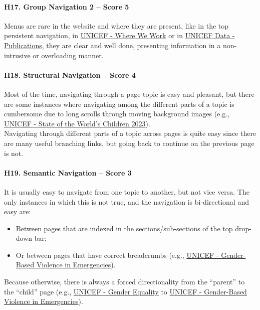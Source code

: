 \paragraph*{H17. Group Navigation 2 – Score 5}
Menus are rare in the website and where they are present, like in the top persistent navigation, in \href{https://www.unicef.org/where-we-work}{UNICEF - Where We Work} or in \href{https://data.unicef.org/resources/resource-type/publications/}{UNICEF Data - Publications}, they are clear and well done, presenting information in a non-intrusive or overloading manner.

\paragraph*{H18. Structural Navigation – Score 4}
Most of the time, navigating through a page topic is easy and pleasant, but there are some instances where navigating among the different parts of a topic is cumbersome due to long scrolls through moving background images (e.g., \href{https://www.unicef.org/reports/state-worlds-children-2023#SOWC}{UNICEF - State of the World's Children 2023}).\\ Navigating through different parts of a topic across pages is quite easy since there are many useful branching links, but going back to continue on the previous page is not.

\paragraph*{H19. Semantic Navigation – Score 3}
It is usually easy to navigate from one topic to another, but not vice versa. The only instances in which this is not true, and the navigation is bi-directional and easy are:
\begin{itemize}
	\item Between pages that are indexed in the sections/sub-sections of the top drop-down bar;
	\item Or between pages that have correct breadcrumbs (e.g., \href{https://www.unicef.org/protection/gender-based-violence-in-emergencies}{UNICEF - Gender-Based Violence in Emergencies}).
\end{itemize}
Because otherwise, there is always a forced directionality from the “parent” to the “child” page (e.g., \href{https://www.unicef.org/gender-equality}{UNICEF - Gender Equality} to \href{https://www.unicef.org/protection/gender-based-violence-in-emergencies}{UNICEF - Gender-Based Violence in Emergencies}).

